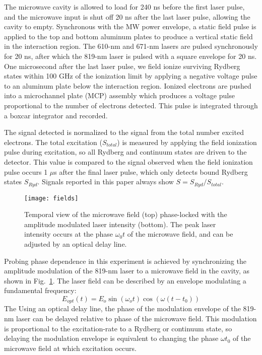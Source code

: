 \documentclass[aps,pra,preprint,groupedaddress]{revtex4-1}
\begin{document}

The microwave cavity is allowed to load for 240 ns before the first laser pulse, and the microwave input is shut off 20 ns after the last laser pulse, allowing the cavity to empty. Synchronous with the MW power envelope, a static field pulse is applied to the top and bottom aluminum plates to produce a vertical static field in the interaction region. The 610-nm and 671-nm lasers are pulsed synchronously for 20 ns, after which the 819-nm laser is pulsed with a square envelope for 20 ns. One microsecond after the last laser pulse, we field ionize surviving Rydberg states within 100 GHz of the ionization limit by applying a negative voltage pulse to an aluminum plate below the interaction region. Ionized electrons are pushed into a microchannel plate (MCP) assembly which produces a voltage pulse proportional to the number of electrons detected. This pulse is integrated through a boxcar integrator and recorded.

The signal detected is normalized to the signal from the total number excited electrons. The total excitation ($S_{total}$) is measured by applying the field ionization pulse during excitation, so all Rydberg and continuum states are driven to the detector. This value is compared to the signal observed when the field ionization pulse occurs 1 $\mu$s after the final laser pulse, which only detects bound Rydberg states $S_{Ryd}$. Signals reported in this paper always show $S = S_{Ryd} / S_{total}$.

\begin{figure}
	\texttt{[image: fields]}
	\caption{Temporal view of the microwave field (top) phase-locked with the amplitude modulated laser intensity (bottom). The peak laser intensity occurs at the phase $\omega_0 t$ of the microwave field, and can be adjusted by an optical delay line.}
	\label{fig:AMLaser}
\end{figure}

Probing phase dependence in this experiment is achieved by synchronizing the amplitude modulation of the 819-nm laser to a microwave field in the cavity, as shown in Fig.~\ref{fig:AMLaser}. The laser field can be described by an envelope modulating a fundamental frequency:
\begin{equation}
E_{opt}(t) = E_o \sin{(\omega_o t)} \cos{(\omega(t-t_0))}
\end{equation}
The 
Using an optical delay line, the phase of the modulation envelope of the 819-nm laser can be delayed relative to phase of the microwave field. This modulation is proportional to the excitation-rate to a Rydberg or continuum state, so delaying the modulation envelope is equivalent to changing the phase $\omega t_0$ of the microwave field at which excitation occurs.
\end{document}
